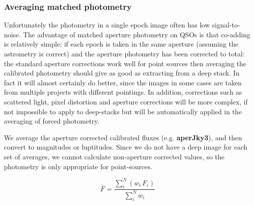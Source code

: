 \documentclass[usenatbib]{mnras}
\begin{document}
\subsubsection{Averaging matched photometry}

Unfortunately the photometry in a single epoch image often has low
signal-to-noise. The advantage of matched aperture photometry on QSOs is that
co-adding is relatively simple: if each epoch is taken in the same aperture
(assuming the astrometry is correct) and the aperture photometry has been
corrected to total: the standard aperture corrections work well for point
sources then averaging the calibrated photometry should give as good as
extracting from a deep stack. In fact it will almost certainly do better, since
the images in some cases are taken from multiple projects with different
pointings. In addition, corrections such as scattered light, pixel distortion
and aperture corrections will be more complex, if not impossible to apply to
deep-stacks but will be automatically applied in the averaging of forced
photometry. 

We average the aperture corrected calibrated fluxes (e.g. {\bf aperJky3}), and
then convert to magnitudes or luptitudes. Since we do not have a deep image for
each set of averages, we cannot calculate non-aperture corrected values, so the
photometry is only appropriate for point-sources. 

\begin{equation}
\bar{F} = \frac{\sum_i^N (w_i\,F_i)}{\sum_i^N w_i}  
\label{eq:avg}
\end{equation}
\end{document}
